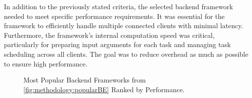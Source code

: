 In addition to the previously stated criteria, the selected backend framework needed to meet specific performance requirements. It was essential for the framework to efficiently handle multiple connected clients with minimal latency. Furthermore, the framework's internal computation speed was critical, particularly for preparing input arguments for each task and managing task scheduling across all clients. The goal was to reduce overhead as much as possible to ensure high performance.
\begin{figure}[htbp]
  \myfloatalign
  \caption{Most Popular Backend Frameworks from \autoref{fig:methodology:popularBE} Ranked by Performance.}
  \label{fig:methodology:benchmarkBE}
\end{figure}
